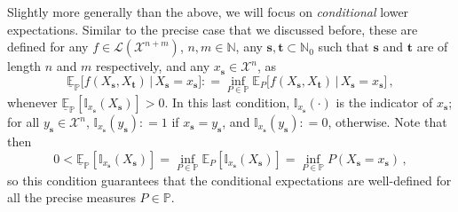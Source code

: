 \documentclass[graybox]{svmult}
\newcommand{\nats}{\mathbb{N}}
\newcommand{\natswith}{\nats_{0}}
\newcommand{\states}{\mathcal{X}}
\newcommand{\gambles}{\mathcal{L}}
\newcommand{\coloneqq}{:\!=}
\begin{document}
Slightly more generally than the above, we will focus on \emph{conditional} lower expectations. Similar to the precise case that we discussed before, these are defined for any $f\in\gambles(\states^{n+m})$, $n,m\in\nats$, any $\mathbf{s},\mathbf{t}\subset\natswith$ such that $\mathbf{s}$ and $\mathbf{t}$ are of length $n$ and $m$ respectively, and any $x_\mathbf{s}\in\states^n$, as
\begin{equation*}
\underline{\mathbb{E}}_\mathbb{P}\bigl[f(X_\mathbf{s},X_\mathbf{t})\,\big\vert\,X_\mathbf{s}=x_\mathbf{s}\bigr] \coloneqq \inf_{P\in\mathbb{P}} \mathbb{E}_P \bigl[f(X_\mathbf{s},X_\mathbf{t})\,\big\vert\,X_\mathbf{s}=x_\mathbf{s}\bigr]\,,
\end{equation*}
whenever $\underline{\mathbb{E}}_\mathbb{P}[\mathbb{I}_{x_\mathbf{s}}(X_\mathbf{s})]>0$. In this last condition, $\mathbb{I}_{x_\mathbf{s}}(\cdot)$ is the indicator of $x_\mathbf{s}$; for all $y_\mathbf{s}\in\states^n$, $\mathbb{I}_{x_\mathbf{s}}(y_\mathbf{s})\coloneqq 1$ if $x_\mathbf{s}=y_\mathbf{s}$, and $\mathbb{I}_{x_\mathbf{s}}(y_\mathbf{s})\coloneqq 0$, otherwise. Note that then
\begin{equation*}
0 < \underline{\mathbb{E}}_\mathbb{P}[\mathbb{I}_{x_\mathbf{s}}(X_\mathbf{s})] = \inf_{P\in\mathbb{P}} \mathbb{E}_P[\mathbb{I}_{x_\mathbf{s}}(X_\mathbf{s})] = \inf_{P\in\mathbb{P}} P(X_\mathbf{s}=x_\mathbf{s})\,,
\end{equation*}
so this condition guarantees that the conditional expectations are well-defined for all the precise measures $P\in\mathbb{P}$.
\end{document}
